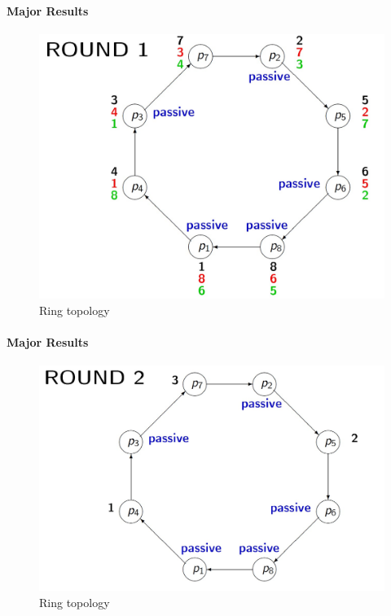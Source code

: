 \documentclass[11pt]{beamer}              %
\begin{document}
\begin{frame}{}
\framesubtitle{Major Results}

\begin{figure}
    \centering
    \includegraphics[scale=0.3]{figures/Screen11.jpg}
    \caption{Ring topology}
    \label{fig:Ring topology}
\end{figure}
\note{
}
\end{frame}



\begin{frame}{}
\framesubtitle{Major Results}

\begin{figure}
    \centering
    \includegraphics[scale=0.3]{figures/Screen12.jpg}
    \caption{Ring topology}
    \label{fig:Ring topology}
\end{figure}
\note{
}
\end{frame}
\end{document}
